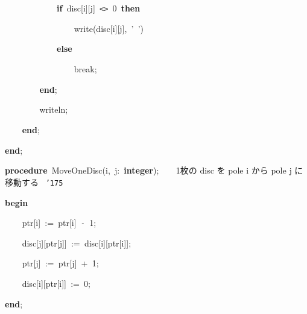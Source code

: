 \documentclass[a4paper,10pt]{article}
\def\mc{\relax}
\begin{document}
\noindent
\mbox{}{\tt\mc \ }{\tt\mc \ }{\tt\mc \ }{\tt\mc \ }{\tt\mc \ }{\tt\mc \ }{\tt\mc \ }{\tt\mc \ }{\tt\mc \ }{\tt\mc \ }{\tt\mc \ }{\tt\mc \ }\textbf{if}{\tt\mc \ }disc[i][j]{\tt\mc \ }{\tt <}{\tt >}{\tt\mc \ }0{\tt\mc \ }\textbf{then}

\noindent
\mbox{}{\tt\mc \ }{\tt\mc \ }{\tt\mc \ }{\tt\mc \ }{\tt\mc \ }{\tt\mc \ }{\tt\mc \ }{\tt\mc \ }{\tt\mc \ }{\tt\mc \ }{\tt\mc \ }{\tt\mc \ }{\tt\mc \ }{\tt\mc \ }{\tt\mc \ }{\tt\mc \ }write(disc[i][j],{\tt\mc \ }'{\tt\mc \ }')

\noindent
\mbox{}{\tt\mc \ }{\tt\mc \ }{\tt\mc \ }{\tt\mc \ }{\tt\mc \ }{\tt\mc \ }{\tt\mc \ }{\tt\mc \ }{\tt\mc \ }{\tt\mc \ }{\tt\mc \ }{\tt\mc \ }\textbf{else}

\noindent
\mbox{}{\tt\mc \ }{\tt\mc \ }{\tt\mc \ }{\tt\mc \ }{\tt\mc \ }{\tt\mc \ }{\tt\mc \ }{\tt\mc \ }{\tt\mc \ }{\tt\mc \ }{\tt\mc \ }{\tt\mc \ }{\tt\mc \ }{\tt\mc \ }{\tt\mc \ }{\tt\mc \ }break;

\noindent
\mbox{}{\tt\mc \ }{\tt\mc \ }{\tt\mc \ }{\tt\mc \ }{\tt\mc \ }{\tt\mc \ }{\tt\mc \ }{\tt\mc \ }\textbf{end};

\noindent
\mbox{}{\tt\mc \ }{\tt\mc \ }{\tt\mc \ }{\tt\mc \ }{\tt\mc \ }{\tt\mc \ }{\tt\mc \ }{\tt\mc \ }writeln;

\noindent
\mbox{}{\tt\mc \ }{\tt\mc \ }{\tt\mc \ }{\tt\mc \ }\textbf{end};

\noindent
\mbox{}\textbf{end};

\noindent
\mbox{}\hfill

\noindent
\mbox{}\textbf{procedure}{\tt\mc \ }MoveOneDisc(i,{\tt\mc \ }j:{\tt\mc \ }\textbf{integer});{\tt\mc \ }{\tt\mc \ }{\tt\mc \ }\rm\mc {\tt\char'173}\  1枚の disc を pole i から pole j に移動する \rm\mc \ {\tt\char'175}
\tt\mc 

\noindent
\mbox{}\textbf{begin}

\noindent
\mbox{}{\tt\mc \ }{\tt\mc \ }{\tt\mc \ }{\tt\mc \ }ptr[i]{\tt\mc \ }:={\tt\mc \ }ptr[i]{\tt\mc \ }{\tt -}{\tt\mc \ }1;

\noindent
\mbox{}{\tt\mc \ }{\tt\mc \ }{\tt\mc \ }{\tt\mc \ }disc[j][ptr[j]]{\tt\mc \ }:={\tt\mc \ }disc[i][ptr[i]];

\noindent
\mbox{}{\tt\mc \ }{\tt\mc \ }{\tt\mc \ }{\tt\mc \ }ptr[j]{\tt\mc \ }:={\tt\mc \ }ptr[j]{\tt\mc \ }+{\tt\mc \ }1;

\noindent
\mbox{}{\tt\mc \ }{\tt\mc \ }{\tt\mc \ }{\tt\mc \ }disc[i][ptr[i]]{\tt\mc \ }:={\tt\mc \ }0;

\noindent
\mbox{}\textbf{end};
\end{document}

